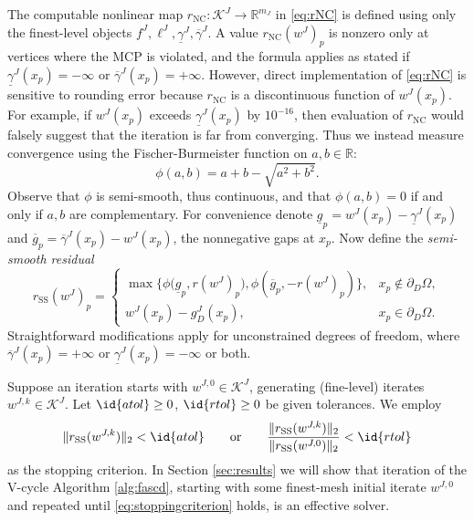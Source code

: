 \documentclass[letterpaper,final,12pt,reqno]{amsart}
\theoremstyle{cstyle}
\theoremstyle{cstyle*}
\theoremstyle{dstyle}
\numberwithin{equation}{section}
\numberwithin{figure}{section}
\numberwithin{table}{section}
\numberwithin{theorem}{section}
\newcommand{\RR}{\mathbb{R}}
\newcommand{\rNC}{r_{\text{NC}}}
\newcommand{\rSS}{r_{\text{SS}}}
\begin{document}
The computable nonlinear map $\rNC : \mathcal{K}^J \to \RR^{m_J}$ in \eqref{eq:rNC} is defined using only the finest-level objects $f^J,\ell^J,\underline{\gamma}^J,\overline{\gamma}^J$.  A value $\rNC(w^J)_p$ is nonzero only at vertices where the MCP is violated, and the formula applies as stated if $\underline{\gamma}^J(x_p)=-\infty$ or $\overline{\gamma}^J(x_p)=+\infty$.  However, direct implementation of \eqref{eq:rNC} is sensitive to rounding error because $\rNC$ is a discontinuous function of $w^J(x_p)$.  For example, if $w^J(x_p)$ exceeds $\underline{\gamma}^J(x_p)$ by $10^{-16}$, then evaluation of $\rNC$ would falsely suggest that the iteration is far from converging.  Thus we instead measure convergence using the Fischer-Burmeister function \cite{BensonMunson2006,Ulbrich2011} on $a,b\in\RR$:
\begin{equation}
\phi(a,b) = a + b - \sqrt{a^2 + b^2}. \label{eq:phiFB}
\end{equation}
Observe that $\phi$ is semi-smooth, thus continuous, and that $\phi(a,b)=0$ if and only if $a,b$ are complementary.  For convenience denote $\underline{g}_p = w^J(x_p) - \underline{\gamma}^J(x_p)$ and $\overline{g}_p = \overline{\gamma}^J(x_p) - w^J(x_p)$, the nonnegative gaps at $x_p$.  Now define the \emph{semi-smooth residual}
\begin{equation}
\rSS(w^J)_p = \begin{cases}
\max\big\{\phi\big(\underline{g}_p, r(w^J)_p\big), \phi\left(\overline{g}_p, -r(w^J)_p\right)\big\}, & x_p \notin \partial_D\Omega, \\
w^J(x_p) - g_D^J(x_p), & x_p \in \partial_D\Omega.
\end{cases} \label{eq:rSS}
\end{equation}
Straightforward modifications apply for unconstrained degrees of freedom, where $\overline{\gamma}^J(x_p) = +\infty$ or $\underline{\gamma}^J(x_p) = -\infty$ or both.

Suppose an iteration starts with $w^{J,0} \in \mathcal{K}^J$, generating (fine-level) iterates $w^{J,k} \in \mathcal{K}^J$.  Let $\id{atol}\ge 0$, $\id{rtol}\ge 0$ be given tolerances.  We employ
\begin{equation}
\|\rSS(w^{J,k})\|_2 < \id{atol} \qquad \text{or} \qquad \frac{\|\rSS(w^{J,k})\|_2}{\|\rSS(w^{J,0})\|_2} < \id{rtol} \label{eq:stoppingcriterion}
\end{equation}
as the stopping criterion.  In Section \ref{sec:results} we will show that iteration of the V-cycle Algorithm \ref{alg:fascd}, starting with some finest-mesh initial iterate $w^{J,0}$ and repeated until \eqref{eq:stoppingcriterion} holds, is an effective solver.
\end{document}
